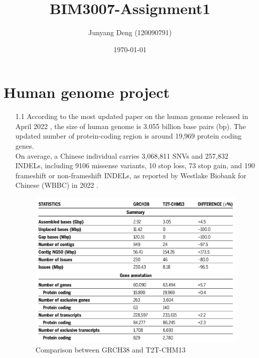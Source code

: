 \documentclass{article}
\title{BIM3007-Assignment1}
\author{Junyang Deng (120090791)}
\date{\today}
\begin{document}
 
\maketitle

\section{Human genome project}

\begin{enumerate}
    \item[1.1] According to the most updated paper on the human genome released in April 2022 \cite{completegenome}, the size of human genome is 3.055 billion base pairs (bp). 
    The updated number of protein-coding region is around 19,969 protein coding genes. \\
    On average, a Chinese individual carries 3,068,811 SNVs and 257,832 INDELs, including 9106 missense variants, 10 stop loss, 73 stop gain, and 190 frameshift or non-frameshift INDELs, as reported by Westlake Biobank for Chinese (WBBC) in 2022 \cite{westlake}. 
    \begin{figure}[h]
        \centering
        \includegraphics[scale=0.4]{A1-Image/comparison.png}
        \caption{Comparison between GRCH38 and T2T-CHM13}
    \end{figure}


\end{enumerate}
\end{document}
